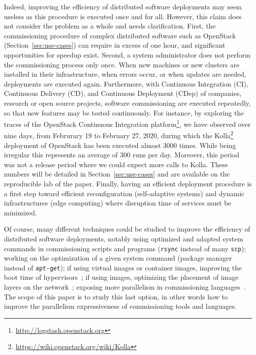 Indeed, improving the efficiency of distributed software deployments may seem useless as this procedure is executed once and for all. However, this claim does not consider the problem as a whole and needs clarification. %
First, the commissioning procedure of complex distributed software such as OpenStack (Section~\ref{sec:use-cases}) can require in excess of
one hour, and significant opportunities for speedup exist. Second, a system
administrator does not perform the commissioning process only once. When new
machines or new clusters are installed in their infrastructure, when errors
occur, or when updates are needed, deployments are executed again.
%
Furthermore, with Continuous Integration (CI), Continuous Delivery (CD), and Continuous Deployment (CDep) of companies, research or open source projects, software commissioning are executed repeatedly, so that new features may be tested continuously. For instance, by exploring the traces of the OpenStack Continuous Integration platform\footnote{\url{http://logstash.openstack.org}}, we have observed over nine days, from Februrary 19 to February 27, 2020, during which the Kolla\footnote{\url{https://wiki.openstack.org/wiki/Kolla}} deployment of OpenStack has been executed almost 3000 times. While being irregular this represents an average of 300 runs per day.
Moreover, this period was not a release period where we could expect more calls to Kolla. These numbers will be detailed in Section~\ref{sec:use-cases} and are available on the reproducible lab of the paper.
Finally, having an efficient deployment procedure is a first step toward efficient reconfiguration (\eg self-adaptive systems) and dynamic infrastructures (\eg edge computing) where disruption time of services must be minimized.

Of course, many different techniques could be studied to improve the efficiency of distributed software deployments, notably using optimized and adapted system commands in commissioning scripts and programs (\eg \texttt{rsync} instead of many \texttt{scp}); working on the optimization of a given system command (\eg \nix package manager instead of \texttt{apt-get}); if using virtual images or container images, improving the boot time of hypervisors~\cite{nguyen:hal-02172288}; if using \docker images, optimizing the placement of image layers on the network~\cite{darrous:hal-01745405}; exposing more parallelism in commissioning languages~\cite{dicosmo:hal-01233489}. The scope of this paper is to study this last option, in other words how to improve the parallelism expressiveness of commissioning tools and languages.
